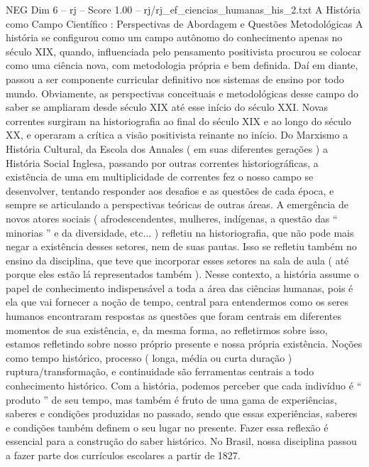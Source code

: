\begin{textsample}{NEG Dim 6 – rj – Score 1.00 – rj/rj\_ef\_ciencias\_humanas\_his\_2.txt}  \label{ex:f6_neg_018}
A História como Campo Científico : Perspectivas de Abordagem e Questões Metodológicas A história se configurou como um campo autônomo do conhecimento apenas no século XIX, quando, influenciada pelo pensamento positivista procurou se colocar como uma ciência nova, com metodologia própria e bem definida.
Daí em diante, passou a ser componente curricular definitivo nos sistemas de ensino por todo mundo.
Obviamente, as perspectivas conceituais e metodológicas desse campo do saber se ampliaram desde século XIX até esse início do século XXI.
Novas correntes surgiram na historiografia ao final do século XIX e ao longo do século XX, e operaram a crítica a visão positivista reinante no início.
Do Marxismo a História Cultural, da Escola dos Annales ( em suas diferentes gerações ) a História Social Inglesa, passando por outras correntes historiográficas, a existência de uma em multiplicidade de correntes fez o nosso campo se desenvolver, tentando responder aos desafios e as questões de cada época, e sempre se articulando a perspectivas teóricas de outras áreas.
A emergência de novos atores sociais ( afrodescendentes, mulheres, indígenas, a questão das “ minorias ” e da diversidade, etc... ) refletiu na historiografia, que não pode mais negar a existência desses setores, nem de suas pautas.
Isso se refletiu também no ensino da disciplina, que teve que incorporar esses setores na sala de aula ( até porque eles estão lá representados também ).
Nesse contexto, a história assume o papel de conhecimento indispensável a toda a área das ciências humanas, pois é ela que vai fornecer a noção de tempo, central para entendermos como os seres humanos encontraram respostas as questões que foram centrais em diferentes momentos de sua existência, e, da mesma forma, ao refletirmos sobre isso, estamos refletindo sobre nosso próprio presente e nossa própria existência.
Noções como tempo histórico, processo ( longa, média ou curta duração ) ruptura/transformação, e continuidade são ferramentas centrais a todo conhecimento histórico.
Com a história, podemos perceber que cada indivíduo é “ produto ” de seu tempo, mas também é fruto de uma gama de experiências, saberes e condições produzidas no passado, sendo que essas experiências, saberes e condições também definem o seu lugar no presente.
Fazer essa reflexão é essencial para a construção do saber histórico.
No Brasil, nossa disciplina passou a fazer parte dos currículos escolares a partir de 1827.

\end{textsample}
